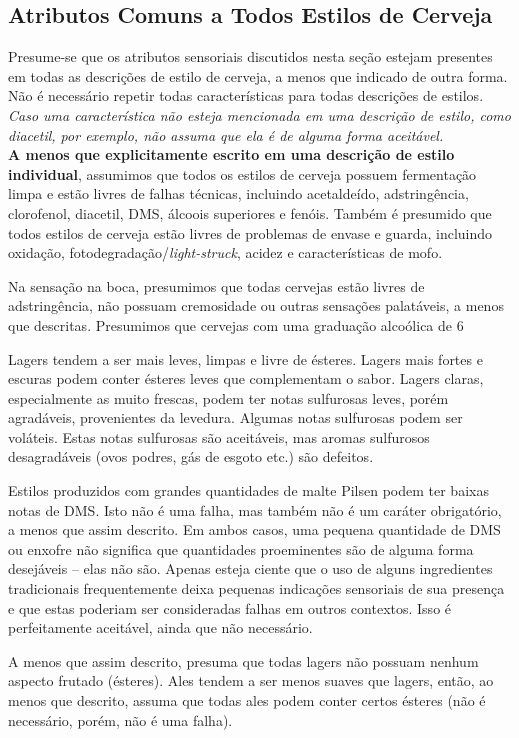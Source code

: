 \subsection*{Atributos Comuns a Todos Estilos de Cerveja}
Presume-se que os atributos sensoriais discutidos nesta seção estejam presentes em todas as descrições de estilo de cerveja, a menos que indicado de outra forma. Não é necessário repetir todas características para todas descrições de estilos. \textit{Caso uma característica não esteja mencionada em uma descrição de estilo, como diacetil, por exemplo, não assuma que ela é de alguma forma aceitável.}\\
\textbf{A menos que explicitamente escrito em uma descrição de estilo individual}, assumimos que todos os estilos de cerveja possuem fermentação limpa e estão livres de falhas técnicas, incluindo acetaldeído, adstringência, clorofenol, diacetil, DMS, álcoois superiores e fenóis. Também é presumido que todos estilos de cerveja estão livres de problemas de envase e guarda, incluindo oxidação, fotodegradação/\textit{light-struck}, acidez e características de mofo.

Na sensação na boca, presumimos que todas cervejas estão livres de adstringência, não possuam cremosidade ou outras sensações palatáveis, a menos que descritas. Presumimos que cervejas com uma graduação alcoólica de 6%

Lagers tendem a ser mais leves, limpas e livre de ésteres. Lagers mais fortes e escuras podem conter ésteres leves que complementam o sabor. Lagers claras, especialmente as muito frescas, podem ter notas sulfurosas leves, porém agradáveis, provenientes da levedura. Algumas notas sulfurosas podem ser voláteis. Estas notas sulfurosas são aceitáveis, mas aromas sulfurosos desagradáveis (ovos podres, gás de esgoto etc.) são defeitos.

Estilos produzidos com grandes quantidades de malte Pilsen podem ter baixas notas de DMS. Isto não é uma falha, mas também não é um caráter obrigatório, a menos que assim descrito. Em ambos casos, uma pequena quantidade de DMS ou enxofre não significa que quantidades proeminentes são de alguma forma desejáveis – elas não são. Apenas esteja ciente que o uso de alguns ingredientes tradicionais frequentemente deixa pequenas indicações sensoriais de sua presença e que estas poderiam ser consideradas falhas em outros contextos. Isso é perfeitamente aceitável, ainda que não necessário.

A menos que assim descrito, presuma que todas lagers não possuam nenhum aspecto frutado (ésteres). Ales tendem a ser menos suaves que lagers, então, ao menos que descrito, assuma que todas ales podem conter certos ésteres (não é necessário, porém, não é uma falha).
